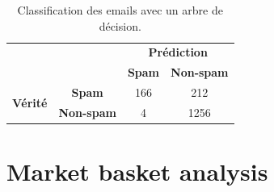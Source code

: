 \documentclass[a4paper]{article}
\begin{document}
\begin{table}[H]
	\centering
	\begin{tabular}{cccl}
	\def\arraystretch{2.0}
	& \textbf{}
	& \multicolumn{2}{c}{\textbf{Prédiction}}\\ \cline{3-4} 
	& \multicolumn{1}{c|}{}
	& \multicolumn{1}{c|}{\textbf{Spam}}
	& \multicolumn{1}{c|}{\textbf{Non-spam}} \\ \cline{2-4} 
	\multicolumn{1}{c|}{\multirow{2}{*}{\textbf{Vérité}}}
	& \multicolumn{1}{c|}{\textbf{Spam}}
	& \multicolumn{1}{c|}{166}
	& \multicolumn{1}{c|}{212}\\ \cline{2-4} 
	\multicolumn{1}{c|}{}
	& \multicolumn{1}{c|}{\textbf{Non-spam}} & \multicolumn{1}{c|}{4}
	& \multicolumn{1}{c|}{1256}\\ \cline{2-4} 
	\end{tabular}
	\caption{Classification des emails avec un arbre de décision.}
\end{table}

\section{Market basket analysis}
\end{document}
